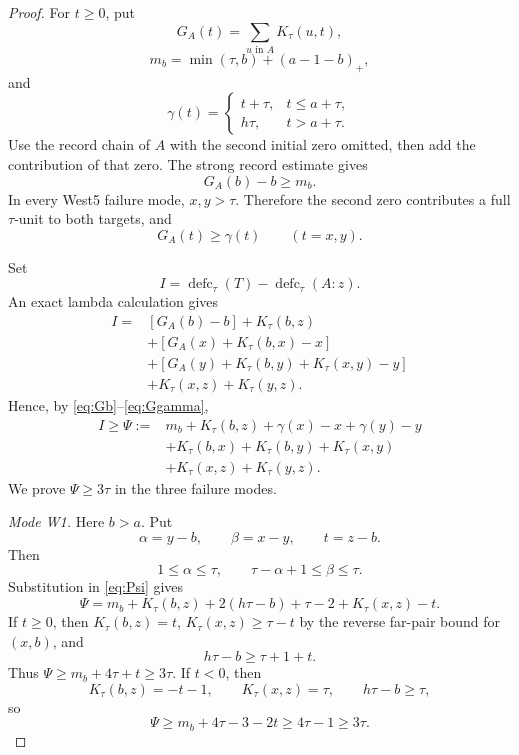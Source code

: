 \documentclass[11pt]{article}
\theoremstyle{definition}
\theoremstyle{remark}
\newcommand{\defc}{\operatorname{defc}}
\begin{document}
\begin{proof}
For $t\ge0$, put
\[
 G_A(t)=\sum_{u\text{ in }A}K_\tau(u,t),
\]
\begin{equation}
 m_b=\min(\tau,b)+(a-1-b)_+,
 \label{eq:mb}
\end{equation}
and
\begin{equation}
 \gamma(t)=
 \begin{cases}
  t+\tau,&t\le a+\tau,\\
  h\tau,&t>a+\tau.
 \end{cases}
 \label{eq:gamma}
\end{equation}
Use the record chain of $A$ with the second initial zero omitted, then
add the contribution of that zero.  The strong record estimate gives
\begin{equation}
 G_A(b)-b\ge m_b.
 \label{eq:Gb}
\end{equation}
In every West5 failure mode, $x,y>\tau$.  Therefore the second zero
contributes a full $\tau$-unit to both targets, and
\begin{equation}
 G_A(t)\ge\gamma(t)
 \qquad(t=x,y).
 \label{eq:Ggamma}
\end{equation}

Set
\[
 I=\defc_\tau(T)-\defc_\tau(A:z).
\]
An exact lambda calculation gives
\[
\begin{aligned}
 I={}&[G_A(b)-b]+K_\tau(b,z)\\
 &+[G_A(x)+K_\tau(b,x)-x]\\
 &+[G_A(y)+K_\tau(b,y)+K_\tau(x,y)-y]\\
 &+K_\tau(x,z)+K_\tau(y,z).
\end{aligned}
\]
Hence, by \eqref{eq:Gb}--\eqref{eq:Ggamma},
\begin{equation}
\begin{aligned}
 I\ge\Psi:={}&m_b+K_\tau(b,z)+\gamma(x)-x+\gamma(y)-y\\
 &+K_\tau(b,x)+K_\tau(b,y)+K_\tau(x,y)\\
 &+K_\tau(x,z)+K_\tau(y,z).
\end{aligned}
\label{eq:Psi}
\end{equation}
We prove $\Psi\ge3\tau$ in the three failure modes.

\smallskip
\noindent\emph{Mode W1.}
Here $b>a$.  Put
\[
 \alpha=y-b,
 \qquad
 \beta=x-y,
 \qquad
 t=z-b.
\]
Then
\[
 1\le\alpha\le\tau,
 \qquad
 \tau-\alpha+1\le\beta\le\tau.
\]
Substitution in \eqref{eq:Psi} gives
\begin{equation}
 \Psi=m_b+K_\tau(b,z)+2(h\tau-b)+\tau-2
      +K_\tau(x,z)-t.
 \label{eq:Psi-W1}
\end{equation}
If $t\ge0$, then $K_\tau(b,z)=t$,
$K_\tau(x,z)\ge\tau-t$ by the reverse far-pair bound for $(x,b)$,
and
\[
 h\tau-b\ge\tau+1+t.
\]
Thus $\Psi\ge m_b+4\tau+t\ge3\tau$.  If $t<0$, then
\[
 K_\tau(b,z)=-t-1,
 \qquad
 K_\tau(x,z)=\tau,
 \qquad
 h\tau-b\ge\tau,
\]
so
\[
 \Psi\ge m_b+4\tau-3-2t\ge4\tau-1\ge3\tau.
\]


\end{proof}
\end{document}
